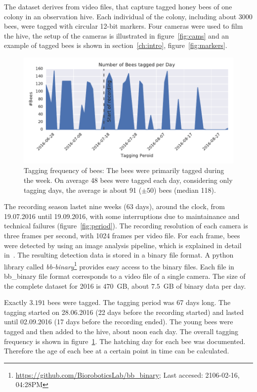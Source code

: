 The dataset derives from video files, that capture tagged honey bees of one colony in an observation hive.
Each individual of the colony, including about 3000 bees, were tagged with circular 12-bit markers. Four cameras were used to film the hive, the setup of the cameras is illustrated in figure~\ref{fig:cams} and an example of tagged bees is shown in section~\ref{ch:intro}, figure~\ref{fig:markers}.

\begin{figure}[htb]
	\centering
	\includegraphics[width=1.0\textwidth]{Figures/tagging_period}
	\caption[Tagging Frequency]{Tagging frequency of bees: The bees were primarily tagged during the week. On average 48 bees were tagged each day, considering only tagging days, the average is about 91 ($\pm50$) bees (median 118).}
	\label{fig:tagging}
\end{figure}

The recording season lastet nine weeks (63 days), around the clock, from 19.07.2016 until 19.09.2016, with some interruptions due to maintainance and technical failures (figure~\ref{fig:period}). The recording resolution of each camera is three frames per second, with 1024 frames per video file. For each frame, bees were detected by using an image analysis pipeline, which is explained in detail in~\cite{wario2015automatic}. The resulting detection data is stored in a binary file format.
A python library called \emph{bb-binary}\footnote{\url{https://github.com/BioroboticsLab/bb_binary}; Last accesed: 2106-02-16, 04:28PM} provides easy access to the binary files. Each file in bb\_binary file format corresponds to a video file of a single camera.
The size of the complete dataset for 2016 is $470$~GB, about $7.5$~GB of binary data per day.

Exactly $3.191$ bees were tagged. The tagging period was 67 days long. The tagging started on 28.06.2016 (22 days before the recording started) and lasted until 02.09.2016 (17 days before the recording ended). The young bees were tagged and then added to the hive, about noon each day. The overall tagging frequency is shown in figure~\ref{fig:tagging}. The hatching day for each bee was documented. Therefore the age of each bee at a certain point in time can be calculated.


